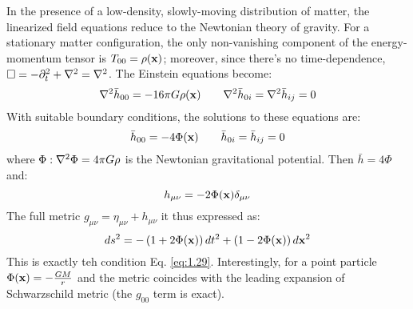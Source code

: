In the presence of a low-density, slowly-moving distribution of matter, the linearized field equations reduce to the Newtonian theory of gravity. For a stationary matter configuration, the only non-vanishing component of the energy-momentum tensor is $ T_{00} = \rho(\mathbf{x}) $; moreover, since there's no time-dependence, $ \Box = -\partial_t^2 + \nabla^2 = \nabla^2 $. The Einstein equations become:
\begin{equation*}
  \nabla^2 \bar{h}_{00} = -16\pi G \rho(\mathbf{x})
  \qquad
  \nabla^2 \bar{h}_{0i} = \nabla^2 \bar{h}_{ij} = 0
\end{equation*}
With suitable boundary conditions, the solutions to these equations are:
\begin{equation*}
  \bar{h}_{00} = -4 \Phi(\mathbf{x})
  \qquad
  \bar{h}_{0i} = \bar{h}_{ij} = 0
\end{equation*}
where $ \Phi : \nabla^2 \Phi = 4\pi G \rho $ is the Newtonian gravitational potential. Then $ \bar{h} = 4 \Phi $ and:
\begin{equation*}
  h_{\mu \nu} = -2\Phi(\mathbf{x}) \delta_{\mu \nu}
\end{equation*}
The full metric $ g_{\mu \nu} = \eta_{\mu \nu} + h_{\mu \nu} $ it thus expressed as:
\begin{equation*}
  ds^2 = - \left( 1 + 2\Phi(\mathbf{x}) \right) dt^2 + \left( 1 - 2\Phi(\mathbf{x}) \right) d\mathbf{x}^2
\end{equation*}
This is exactly teh condition Eq. \ref{eq:1.29}. Interestingly, for a point particle $ \Phi(\mathbf{x}) = - \frac{GM}{r} $ and the metric coincides with the leading expansion of Schwarzschild metric (the $ g_{00} $ term is exact).










